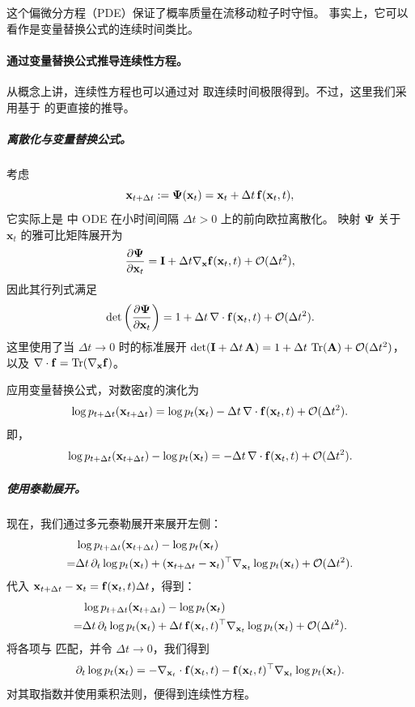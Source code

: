 这个偏微分方程（PDE）保证了概率质量在流移动粒子时守恒。  
事实上，它可以看作是变量替换公式的连续时间类比。


\paragraph{通过变量替换公式推导连续性方程。} 从概念上讲，连续性方程也可以通过对  取连续时间极限得到。不过，这里我们采用基于  的更直接的推导。
\subparagraph{离散化与变量替换公式。}
考虑
\[
\mathbf{x}_{t+\Delta t} := \bm{\Psi}(\mathbf{x}_t) = \mathbf{x}_t + \Delta t\, {\mathbf{f}}(\mathbf{x}_t, t),
\]
它实际上是  中 ODE 在小时间间隔 $\Delta t > 0$ 上的前向欧拉离散化。
映射 $\bm{\Psi}$ 关于 $\mathbf{x}_t$ 的雅可比矩阵展开为
\[
\frac{\partial \bm{\Psi}}{\partial \mathbf{x}_t} = {\mathbf{I}} + \Delta t \nabla_{\mathbf{x}} {\mathbf{f}}(\mathbf{x}_t, t) + \mathcal{O}(\Delta t^2),
\]
因此其行列式满足
\[
\det\left( \frac{\partial \bm{\Psi}}{\partial \mathbf{x}_t} \right) = 1 + \Delta t\, \nabla \cdot {\mathbf{f}}(\mathbf{x}_t, t) + \mathcal{O}(\Delta t^2).
\]
这里使用了当 $\Delta t \to 0$ 时的标准展开 $\det({\mathbf{I}} + \Delta t\, \mathbf{A}) = 1 + \Delta t\, \operatorname{Tr}(\mathbf{A}) + \mathcal{O}(\Delta t^2)$，以及 $\nabla \cdot {\mathbf{f}} = \operatorname{Tr}(\nabla_{\mathbf{x}} {\mathbf{f}})$。

应用变量替换公式，对数密度的演化为
\begin{align*}
\log p_{t+\Delta t}(\mathbf{x}_{t+\Delta t}) = \log p_t(\mathbf{x}_t) - \Delta t\, \nabla \cdot {\mathbf{f}}(\mathbf{x}_t, t) + \mathcal{O}(\Delta t^2).
\end{align*}
即，
\begin{align}
    \label{eq:log-density-diff}
\log p_{t+\Delta t}(\mathbf{x}_{t+\Delta t}) - \log p_t(\mathbf{x}_t) = - \Delta t\, \nabla \cdot {\mathbf{f}}(\mathbf{x}_t, t) + \mathcal{O}(\Delta t^2).
\end{align}

\subparagraph{使用泰勒展开。}
现在，我们通过多元泰勒展开来展开左侧：
\begin{align*}
    &\log p_{t+\Delta t}({\mathbf{x}}_{t+\Delta t}) 
    - \log p_t({\mathbf{x}}_t) 
    \\= &\Delta t\, \partial_t \log p_t({\mathbf{x}}_t) 
    + ({\mathbf{x}}_{t+\Delta t} - {\mathbf{x}}_t)^\top \nabla_{{\mathbf{x}}_t} \log p_t({\mathbf{x}}_t) 
    + \mathcal{O}(\Delta t^2).
\end{align*}
代入 ${\mathbf{x}}_{t+\Delta t} - {\mathbf{x}}_t = {\mathbf{f}}({\mathbf{x}}_t, t)\Delta t$，得到：
\begin{align*}
    &\log p_{t+\Delta t}({\mathbf{x}}_{t+\Delta t}) 
    - \log p_t({\mathbf{x}}_t) 
    \\= & \Delta t\, \partial_t \log p_t({\mathbf{x}}_t) 
    + \Delta t\, {\mathbf{f}}({\mathbf{x}}_t, t)^\top \nabla_{{\mathbf{x}}_t} \log p_t({\mathbf{x}}_t) 
    + \mathcal{O}(\Delta t^2).
\end{align*}
将各项与  匹配，并令 $\Delta t \to 0$，我们得到
\begin{equation*}
    \partial_t \log p_t({\mathbf{x}}_t) 
    = - \nabla_{{\mathbf{x}}_t} \cdot {\mathbf{f}}({\mathbf{x}}_t, t) 
    - {\mathbf{f}}({\mathbf{x}}_t, t)^\top \nabla_{{\mathbf{x}}_t} \log p_t({\mathbf{x}}_t).
\end{equation*}
对其取指数并使用乘积法则，便得到连续性方程。


